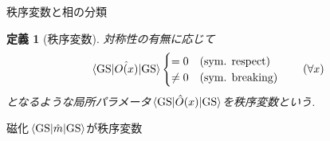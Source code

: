 \documentclass[dvipdfm]{beamer}
\newtheorem*{defn}{定義}
\newtheorem*{exmpl}{例}
\begin{document}


\begin{frame}{秩序変数と相の分類}
    \begin{defn}[秩序変数]
        対称性の有無に応じて
        \begin{equation*}
            \ev{\hat{O(x)}}{\mathrm{GS}}
            \begin{cases}
                =0 & (\text{sym. respect})
                \\
                \neq0 & (\text{sym. breaking})
            \end{cases}
            \qquad
            (\forall x)
        \end{equation*}
        となるような局所パラメータ$\ev{\hat{O}(x)}{\mathrm{GS}}$を秩序変数という.
    \end{defn}
    \begin{example}
        磁化$\ev{\hat{m}}{\mathrm{GS}}$が秩序変数
    \end{example}
\end{frame}
\end{document}
